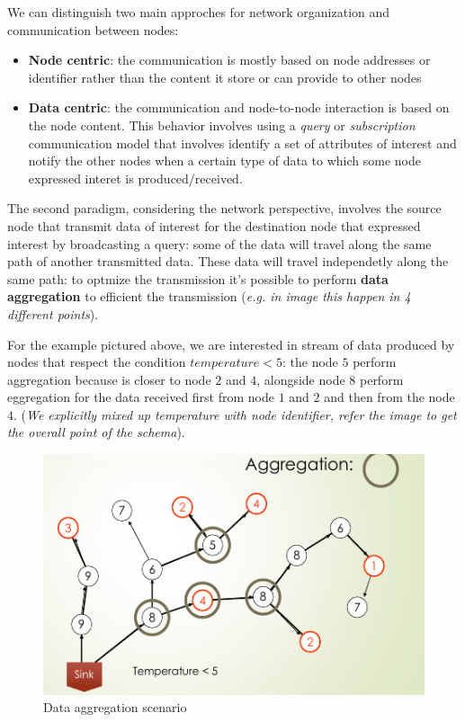\documentclass[10pt,a4paper]{report}
\theoremstyle{definition}
\begin{document}
We can distinguish two main approches for network organization and communication between nodes:
\begin{itemize}
	\item 
	\textbf{Node centric}: the communication is mostly based on node addresses or identifier rather than the content it store or can provide to other nodes
	\item 
	\textbf{Data centric}: the communication and node-to-node interaction is based on the node content. This behavior involves using a \textit{query} or \textit{subscription} communication model that involves identify a set of attributes of interest  and notify the other nodes when a certain type of data to which some node expressed interet is produced/received.
\end{itemize}

The second paradigm, considering the network perspective, involves the source node that transmit data of interest for the destination node that expressed interest by broadcasting a query: some of the data will travel along the same path of another transmitted data. These data will travel independetly along the same path: to optmize the transmission it's possible to perform \textbf{data aggregation} to efficient the transmission (\textit{e.g. in image this happen in 4 different points}).

For the example pictured above, we are interested in stream of data produced by nodes that respect the condition $temperature < 5$: the node $5$ perform aggregation because is closer to node $2$ and $4$, alongside node $8$ perform eggregation for the data received first from node $1$ and $2$ and then from the node $4$. (\textit{We explicitly mixed up temperature with node identifier, refer the image to get the overall point of the schema}).

\begin{figure}[h]
	\centering\includegraphics[scale=0.50]{images/Pasted image 20230522190051.png}
	\caption{Data aggregation scenario}
\end{figure}
\end{document}
